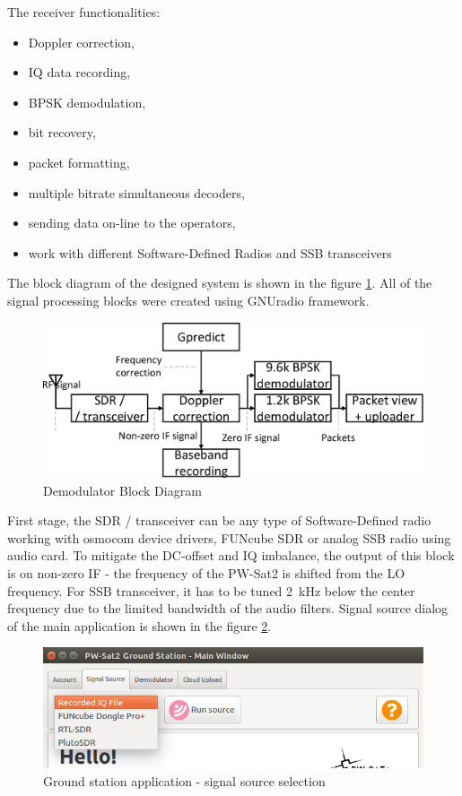 The receiver  functionalities:
\begin{itemize}
    \item Doppler correction,
    \item IQ data recording,
    \item BPSK demodulation,
    \item bit recovery,
    \item packet formatting,
    \item multiple bitrate simultaneous decoders,
    \item sending data on-line to the operators,
    \item work with different Software-Defined Radios and SSB transceivers
\end{itemize}

The block diagram of the designed system is shown in the figure \ref{demodulator_block_diagram}. All of the signal processing blocks were created using GNUradio framework.

\begin{figure}[H]
    \centering
    \includegraphics[width=0.6\paperwidth]{img/3/demodulator_block_diagram.eps}
    \caption{Demodulator Block Diagram}
    \label{demodulator_block_diagram}
\end{figure}

First stage, the SDR / transceiver can be any type of Software-Defined radio working with osmocom device drivers, FUNcube SDR or analog SSB radio using audio card. To mitigate the DC-offset and IQ imbalance, the output of this block is on non-zero IF - the frequency of the PW-Sat2 is shifted from the LO frequency. For SSB transceiver, it has to be tuned \SI{2}{\kHz} below the center frequency due to the limited bandwidth of the audio filters. Signal source dialog of the main application is shown in the figure \ref{gs_source_selection}.

\begin{figure}[H]
    \centering
    \includegraphics[width=0.6\paperwidth]{img/3/gs_source_selection.png}
    \caption{Ground station application - signal source selection}
    \label{gs_source_selection}
\end{figure}

